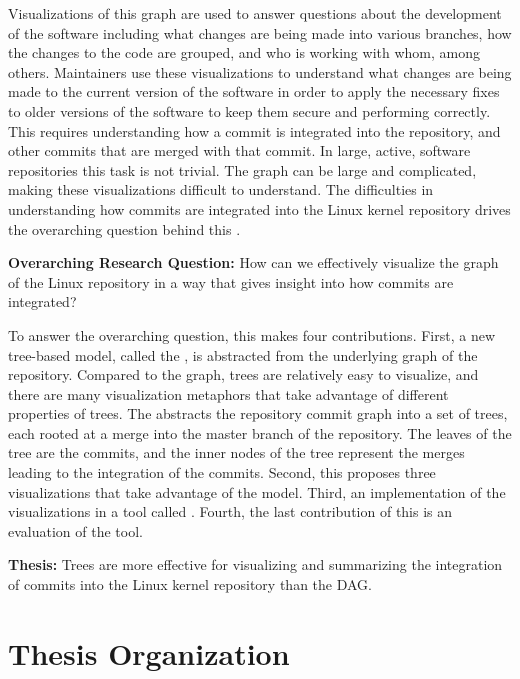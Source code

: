 Visualizations of this graph are used to answer questions about the
development of the software including what changes are being made into
various branches, how the changes to the code are grouped, and who is
working with whom, among others. Maintainers use these visualizations to
understand what changes are being made to the current version of the
software in order to apply the necessary fixes to older versions of the
software to keep them secure and performing correctly. This requires
understanding how a commit is integrated into the repository, and other
commits that are merged with that commit. In large, active, software
repositories this task is not trivial.
The graph can be large and
complicated, making these visualizations difficult to understand.
The difficulties in understanding how commits are integrated into the
Linux kernel repository drives the overarching question behind this
\paper{}.

\begin{textbox}
  \textbf{Overarching Research Question:} How can we effectively
  visualize the graph of the Linux repository in a way that gives
  insight into how commits are integrated?
\end{textbox}

To answer the overarching question, this \paper{} makes four
contributions.
First, a new tree-based model, called the \mt{},
is abstracted from the underlying graph of the repository.
Compared to the graph, trees are relatively easy to visualize, and there are many visualization metaphors that take advantage of different properties of trees.
The \mt{} abstracts the repository commit graph into a set of trees, each rooted at a merge into the master branch of the repository.
The leaves of the tree are the commits, and the inner nodes of the tree represent the merges leading to the integration of the commits.
Second, this \paper{} proposes three visualizations that take advantage of the \mt{} model.
Third, an implementation of the visualizations in a tool called \tool{}.
Fourth, the last contribution of this \paper{} is an evaluation of the
tool.

\begin{textbox}
  \textbf{Thesis:} Trees are more effective for visualizing and
  summarizing the integration of commits into the Linux kernel
  repository than the DAG.
\end{textbox}

\section{Thesis Organization}\label{sec:thesis_organization}

